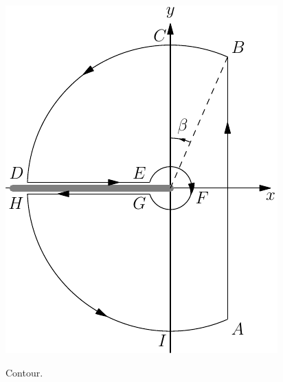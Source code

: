 \begin{marginfigure} \label{F:cont1}
  \includegraphics{graphics/contour.pdf}
	\caption{Contour.}
\end{marginfigure}


